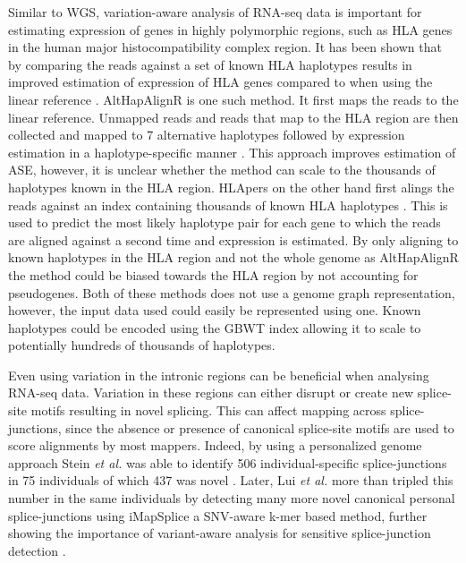 Similar to WGS, variation-aware analysis of RNA-seq data is important for estimating expression of genes in highly polymorphic regions, such as HLA genes in the human major histocompatibility complex region. 
It has been shown that by comparing the reads against a set of known HLA haplotypes results in improved estimation of expression of HLA genes compared to when using the linear reference \cite{Lee2018-mm,Aguiar2019-fy}.
AltHapAlignR is one such method. It first maps the reads to the linear reference. Unmapped reads and reads that map to the HLA region are then collected and mapped to 7 alternative haplotypes followed by expression estimation in a haplotype-specific manner \cite{Lee2018-mm}. 
This approach improves estimation of ASE, however, it is unclear whether the method can scale to the thousands of haplotypes known in the HLA region.
HLApers on the other hand first alings the reads against an index containing thousands of known HLA haplotypes \cite{Aguiar2019-fy}. 
This is used to predict the most likely haplotype pair for each gene to which the reads are aligned against a second time and expression is estimated. 
By only aligning to known haplotypes in the HLA region and not the whole genome as AltHapAlignR the method could be biased towards the HLA region by not accounting for pseudogenes.
Both of these methods does not use a genome graph representation, however, the input data used could easily be represented using one.
Known haplotypes could be encoded using the GBWT index allowing it to scale to potentially hundreds of thousands of haplotypes. 

Even using variation in the intronic regions can be beneficial when analysing RNA-seq data. 
Variation in these regions can either disrupt or create new splice-site motifs resulting in novel splicing. 
This can affect mapping across splice-junctions, since the absence or presence of canonical splice-site motifs are used to score alignments by most mappers. 
Indeed, by using a personalized genome approach Stein \textit{et al.} was able to identify 506 individual-specific splice-junctions in 75 individuals of which 437 was novel \cite{Stein_2015}. 
Later, Lui \textit{et al.} more than tripled this number in the same individuals by detecting many more novel canonical personal splice-junctions using iMapSplice a SNV-aware k-mer based method, further showing the importance of variant-aware analysis for sensitive splice-junction detection \cite{Liu_2018}. 


